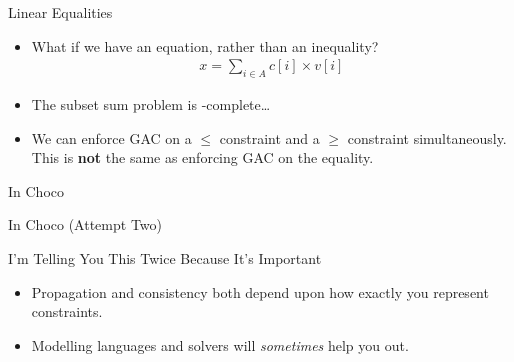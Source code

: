 \documentclass{beamer}
\begin{document}
\begin{frame}{Linear Equalities}
    \begin{itemize}
        \item What if we have an equation, rather than an inequality?
            \begin{align*}x = \sum_{i \in A}{c[i] \times v[i]}\end{align*}
        \item <2-> The subset sum problem is \NP-complete\ldots
        \item <3-> We can enforce GAC on a $\le$ constraint and a $\ge$
            constraint simultaneously. This is \textbf{not} the same as enforcing GAC
            on the equality.
    \end{itemize}
\end{frame}

\begin{frame}[fragile]{In Choco}
     {
        
    }
     {
        
    }
\end{frame}

\begin{frame}{In Choco (Attempt Two)}
     {
        
    }
     {
        \begin{minipage}{0.47\paperwidth}
        \end{minipage}\begin{minipage}{0.44\paperwidth}
        \end{minipage}
    }
\end{frame}

\begin{frame}{I'm Telling You This Twice Because It's Important}
    \begin{itemize}
        \item Propagation and consistency both depend upon how exactly you represent constraints.
        \item Modelling languages and solvers will \emph{sometimes} help you out.
    \end{itemize}
\end{frame}
\end{document}
